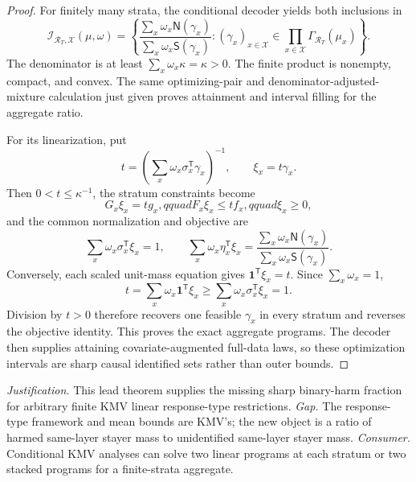 \documentclass{article}
\begin{document}
\begin{proof}
For finitely many strata, the conditional decoder yields both inclusions in
\[
 \mathcal I_{\mathcal R_T,\mathcal X}(\mu,\omega)
 =\left\{
 \frac{\sum_x\omega_x\mathsf N(\gamma_x)}
 {\sum_x\omega_x\mathsf S(\gamma_x)}:
 (\gamma_x)_{x\in\mathcal X}\in
 \prod_{x\in\mathcal X}\Gamma_{\mathcal R_T}(\mu_x)
 \right\}.
\]
The denominator is at least \(\sum_x\omega_x\kappa=\kappa>0\).  The finite product is nonempty, compact, and convex.  The same optimizing-pair and denominator-adjusted-mixture calculation just given proves attainment and interval filling for the aggregate ratio.

For its linearization, put
\[
 t=\left(\sum_x\omega_x\sigma_x^{\mathsf T}\gamma_x\right)^{-1},
 \qquad
 \xi_x=t\gamma_x.
\]
Then \(0<t\le\kappa^{-1}\), the stratum constraints become
\[
 G_x\xi_x=tg_x,qquad
 F_x\xi_x\le tf_x,qquad
 \xi_x\ge0,
\]
and the common normalization and objective are
\[
 \sum_x\omega_x\sigma_x^{\mathsf T}\xi_x=1,
 \qquad
 \sum_x\omega_x\eta_x^{\mathsf T}\xi_x
 =\frac{\sum_x\omega_x\mathsf N(\gamma_x)}
 {\sum_x\omega_x\mathsf S(\gamma_x)}.
\]
Conversely, each scaled unit-mass equation gives \(\mathbf 1^{\mathsf T}\xi_x=t\).  Since \(\sum_x\omega_x=1\),
\[
 t=\sum_x\omega_x\mathbf 1^{\mathsf T}\xi_x
 \ge\sum_x\omega_x\sigma_x^{\mathsf T}\xi_x=1.
\]
Division by \(t>0\) therefore recovers one feasible \(\gamma_x\) in every stratum and reverses the objective identity.  This proves the exact aggregate programs.  The decoder then supplies attaining covariate-augmented full-data laws, so these optimization intervals are sharp causal identified sets rather than outer bounds.
\end{proof}
\par\smallskip\noindent \textit{Justification.} This lead theorem supplies the missing sharp binary-harm fraction for arbitrary finite KMV linear response-type restrictions. \textit{Gap.} The response-type framework and mean bounds are KMV's; the new object is a ratio of harmed same-layer stayer mass to unidentified same-layer stayer mass. \textit{Consumer.} Conditional KMV analyses can solve two linear programs at each stratum or two stacked programs for a finite-strata aggregate.
\end{document}

